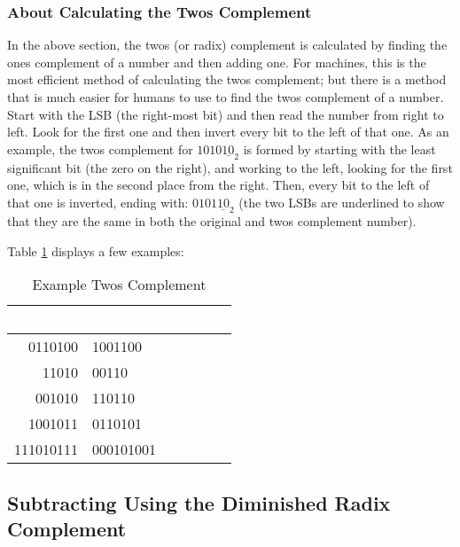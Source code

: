\subsubsection{About Calculating the Twos Complement}
\label{MO:subsub:about_calculating_twos_complement}

In the above section, the twos (or radix) complement is calculated by finding the ones complement of a number and then adding one. For machines, this is the most efficient method of calculating the twos complement; but there is a method that is much easier for humans to use to find the twos complement of a number. Start with the \ac{LSB} (the right-most bit) and then read the number from right to left. Look for the first one and then invert every bit to the left of that one. As an example, the twos complement for $ 1010\underline{10}_2 $ is formed by starting with the least significant bit (the zero on the right), and working to the left, looking for the first one, which is in the second place from the right. Then, every bit to the left of that one is inverted, ending with: $ 0101\underline{10}_2 $ (the two \acp{LSB} are underlined to show that they are the same in both the original and twos complement number).

Table \ref{MO:tab:example_twos_comp} displays a few examples:

\begin{table}[H]
  \sffamily
  \newcommand{\head}[1]{\textcolor{white}{\textbf{#1}}}    
  \begin{center}
    \begin{tabular}{ r l } 
      \hline
      \rowcolor{black!75}
      {\head{Number}} & {\head{Twos Complement}} \\
      \hline
      0110100   & 1001100   \\
      11010     & 00110     \\
      001010    & 110110    \\
      1001011   & 0110101   \\
      111010111 & 000101001 \\
      \hline
    \end{tabular}
  \end{center}
  \caption{Example Twos Complement}
  \label{MO:tab:example_twos_comp}
\end{table} 

\subsection{Subtracting Using the Diminished Radix Complement }
\label{MO:sub:subtracting_using_diminished_radix}

